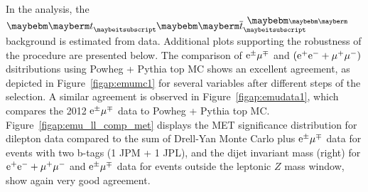 
In the analysis, the $\Pqt \Paqt$ background is estimated from data. Additional
plots supporting the robustness of the procedure are presented below.
The comparison of $\mathrm{e}^\pm\mu^\mp$ and $(\mathrm{e^+e^-}+\mu^+\mu^-)$ dsitributions using Powheg + Pythia top MC shows
an excellent agreement, as depicted in Figure~\ref{figap:emumc1}
for several variables after different steps of the selection. A similar agreement
is observed in Figure~\ref{figap:emudata1}, which compares the 2012 $\mathrm{e}^\pm\mu^\mp$ data to Powheg + Pythia top MC.
Figure~\ref{figap:emu_ll_comp_met} displays the MET significance distribution
for dilepton data compared to the sum of Drell-Yan Monte Carlo
plus $\mathrm{e}^\pm\mu^\mp$ data for events with two b-tags (1 JPM + 1 JPL), and the dijet
invariant mass (right) for $\mathrm{e^+e^-} + \mu^+\mu^-$ and $\mathrm{e}^\pm\mu^\mp$ data for events outside the leptonic $Z$ mass window,
show again very good agreement.

